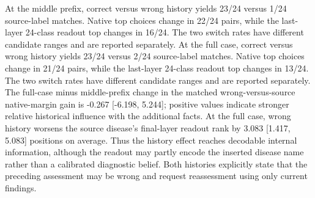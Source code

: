 At the middle prefix, correct versus wrong history yields 23/24 versus 1/24 source-label matches. Native top choices change in 22/24 pairs, while the last-layer 24-class readout top changes in 16/24. The two switch rates have different candidate ranges and are reported separately. At the full case, correct versus wrong history yields 23/24 versus 2/24 source-label matches. Native top choices change in 21/24 pairs, while the last-layer 24-class readout top changes in 13/24. The two switch rates have different candidate ranges and are reported separately. The full-case minus middle-prefix change in the matched wrong-versus-source native-margin gain is -0.267 [-6.198, 5.244]; positive values indicate stronger relative historical influence with the additional facts. At the full case, wrong history worsens the source disease's final-layer readout rank by 3.083 [1.417, 5.083] positions on average. Thus the history effect reaches decodable internal information, although the readout may partly encode the inserted disease name rather than a calibrated diagnostic belief. Both histories explicitly state that the preceding assessment may be wrong and request reassessment using only current findings.
